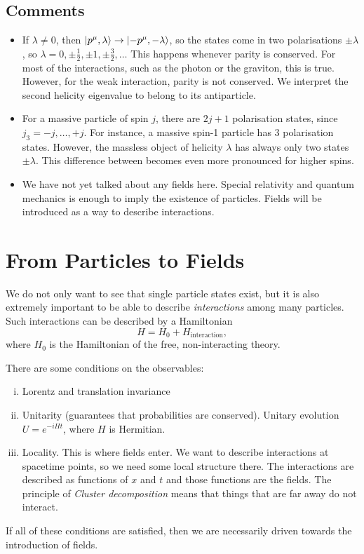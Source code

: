 \subsection*{Comments}%

\begin{itemize}
  \item If $\lambda \neq 0$, then $\ket{p^{\mu}, \lambda} \to \ket{-p^{\mu}, -\lambda}$, so the states come in two polarisations $\pm\lambda$, so $\lambda = 0, \pm \frac{1}{2}, \pm 1, \pm \frac{3}{2}, \dots$
    This happens whenever parity is conserved. For most of the interactions, such as the photon or the graviton, this is true.
    However, for the weak interaction, parity is not conserved.
    We interpret the second helicity eigenvalue to belong to its antiparticle.
  \item For a massive particle of spin $j$, there are $2j+1$ polarisation states, since $j_3 = -j, \dots, +j$.
    For instance, a massive spin-1 particle has $3$ polarisation states. However, the massless object of helicity $\lambda$ has always only two states $\pm \lambda$. This difference between becomes even more pronounced for higher spins.
  \item We have not yet talked about any fields here. Special relativity and quantum mechanics is enough to imply the existence of particles.
    Fields will be introduced as a way to describe interactions.
\end{itemize}

\section{From Particles to Fields}%
\label{sec:from_particles_to_field}

We do not only want to see that single particle states exist, but it is also extremely important to be able to describe \emph{interactions} among many particles.
Such interactions can be described by a Hamiltonian
\begin{equation}
  H = H_0 + H_{\text{interaction}},
\end{equation}
where $H_0$  is the Hamiltonian of the free, non-interacting theory.

There are some conditions on the observables:
\begin{enumerate}[(i)]
  \item Lorentz and translation invariance
  \item Unitarity (guarantees that probabilities are conserved). Unitary evolution $U = e^{-i H t}$, where $H$ is Hermitian.
  \item Locality. This is where fields enter. We want to describe interactions at spacetime points, so we need some local structure there. The interactions are described as functions of $x$ and $t$ and those functions are the fields.
    The principle of \emph{Cluster decomposition} means that things that are far away do not interact.
\end{enumerate}
If all of these conditions are satisfied, then we are necessarily driven towards the introduction of fields.
